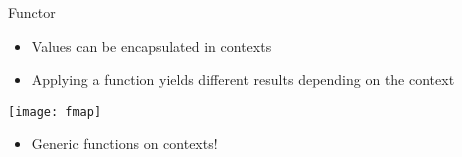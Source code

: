 \begin{frame}{Functor}
	\begin{itemize}
		\item Values can be encapsulated in contexts
		\item Applying a function yields different results depending on the context
	\end{itemize}
	\texttt{[image: fmap]}
	\begin{itemize}
		\item<2-> Generic functions on contexts!
	\end{itemize}
\end{frame}